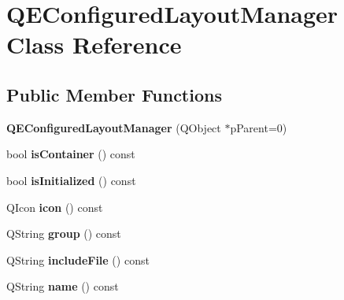 \hypertarget{classQEConfiguredLayoutManager}{
\section{QEConfiguredLayoutManager Class Reference}
\label{classQEConfiguredLayoutManager}
}
\subsection*{Public Member Functions}
\begin{DoxyCompactItemize}
\item 
\hypertarget{classQEConfiguredLayoutManager_a7abf7c4a0486f8458896d573467187f7}{
{\bfseries QEConfiguredLayoutManager} (QObject $\ast$pParent=0)}
\label{classQEConfiguredLayoutManager_a7abf7c4a0486f8458896d573467187f7}

\item 
\hypertarget{classQEConfiguredLayoutManager_ad74dbbd5cf088ddd895b24008c0663a3}{
bool {\bfseries isContainer} () const }
\label{classQEConfiguredLayoutManager_ad74dbbd5cf088ddd895b24008c0663a3}

\item 
\hypertarget{classQEConfiguredLayoutManager_a36c9a53c7761221c251b7a05fc15195c}{
bool {\bfseries isInitialized} () const }
\label{classQEConfiguredLayoutManager_a36c9a53c7761221c251b7a05fc15195c}

\item 
\hypertarget{classQEConfiguredLayoutManager_aa1c4bbbcfd9feb6044a70795e5426cd5}{
QIcon {\bfseries icon} () const }
\label{classQEConfiguredLayoutManager_aa1c4bbbcfd9feb6044a70795e5426cd5}

\item 
\hypertarget{classQEConfiguredLayoutManager_aaf51d619eb1a7d4f6899908aa9ff2d1f}{
QString {\bfseries group} () const }
\label{classQEConfiguredLayoutManager_aaf51d619eb1a7d4f6899908aa9ff2d1f}

\item 
\hypertarget{classQEConfiguredLayoutManager_a67ef700270071cf2009d156f466b3ad8}{
QString {\bfseries includeFile} () const }
\label{classQEConfiguredLayoutManager_a67ef700270071cf2009d156f466b3ad8}

\item 
\hypertarget{classQEConfiguredLayoutManager_a18f4c7d1e4814526416f725469c09c15}{
QString {\bfseries name} () const }
\label{classQEConfiguredLayoutManager_a18f4c7d1e4814526416f725469c09c15}


\end{DoxyCompactItemize}
